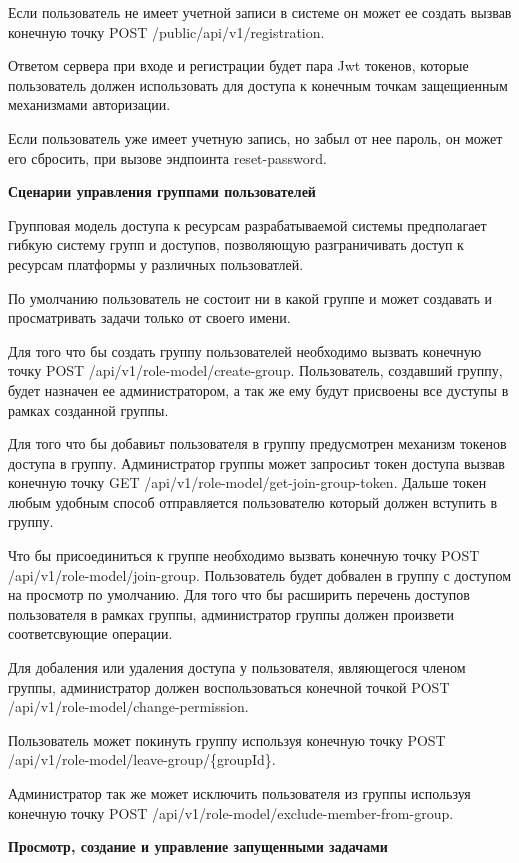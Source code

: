 Если пользователь не имеет учетной записи в системе он может ее создать вызвав конечную точку POST /public/api/v1/registration.

Ответом сервера при входе и регистрации будет пара Jwt токенов\cite{ahmed2019authentication}, которые пользователь должен использовать для доступа к конечным точкам защещиенным механизмами авторизации.

Если пользователь уже имеет учетную запись, но забыл от нее пароль, он может его сбросить, при вызове эндпоинта reset-password.

{\bf Сценарии управления группами пользователей }

Групповая модель доступа к ресурсам разрабатываемой системы предполагает гибкую систему групп и доступов, позволяющую разграничивать доступ к ресурсам платформы у различных пользоватлей.

По умолчанию пользователь не состоит ни в какой группе и может создавать и просматривать задачи только от своего имени.

Для того что бы создать группу пользователей необходимо вызвать конечную точку POST /api/v1/role-model/create-group. Пользователь, создавший группу, будет назначен ее администратором, а так же ему будут присвоены все дуступы в рамках созданной группы.

Для того что бы добавиьт пользователя в группу предусмотрен механизм токенов доступа в группу.
Администратор группы может запросиьт токен доступа вызвав конечную точку GET /api/v1/role-model/get-join-group-token.
Дальше токен любым удобным способ отправляется пользователю который должен вступить в группу.

Что бы присоединиться к группе необходимо вызвать конечную точку POST /api/v1/role-model/join-group.
Пользователь будет добвален в группу с доступом на просмотр по умолчанию.
Для того что бы расширить перечень доступов пользователя в рамках группы, администратор группы должен произвети соответсвующие операции.

Для добаления или удаления доступа у пользователя, являющегося членом группы, администратор должен воспользоваться конечной точкой POST /api/v1/role-model/change-permission.

Пользователь может покинуть группу используя конечную точку POST /api/v1/role-model/leave-group/\{groupId\}.

Администратор так же может исключить пользователя из группы используя конечную точку POST /api/v1/role-model/exclude-member-from-group.

{\bf Просмотр, создание и управление запущенными задачами }

